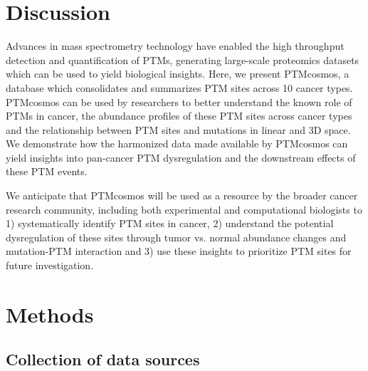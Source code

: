 \section{Discussion}
Advances in mass spectrometry technology have enabled the high throughput detection and quantification of PTMs, generating large-scale proteomics datasets which can be used to yield biological insights. Here, we present PTMcosmos, a database which consolidates and summarizes PTM sites across 10 cancer types. PTMcosmos can be used by researchers to better understand the known role of PTMs in cancer, the abundance profiles of these PTM sites across cancer types and the relationship between PTM sites and mutations in linear and 3D space. We demonstrate how the harmonized data made available by PTMcosmos can yield insights into pan-cancer PTM dysregulation and the downstream effects of these PTM events.

We anticipate that PTMcosmos will be used as a resource by the broader cancer research community, including both experimental and computational biologists to 1) systematically identify PTM sites in cancer, 2) understand the potential dysregulation of these sites through tumor vs. normal abundance changes and mutation-PTM interaction and 3) use these insights to prioritize PTM sites for future investigation.



\section{Methods}

\tightlists
\subsection{Collection of data sources}

